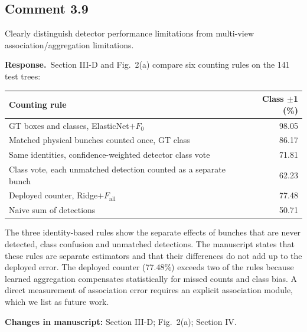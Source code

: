 \documentclass[10pt,a4paper]{article}
\newcommand{\resp}{\textbf{Response.}\ }
\newcommand{\changes}[1]{\par\textbf{Changes in manuscript:} #1}
\newcommand{\Fall}{F_{\text{all}}}
\begin{document}
\subsection{Comment 3.9}
\begin{cmt}
Clearly distinguish detector performance limitations from multi-view
association/aggregation limitations.
\end{cmt}
\resp Section III-D and Fig.~2(a) compare six counting rules on the 141 test trees:

\begin{center}
\small
\begin{tabular}{@{}lr@{}}
\toprule
Counting rule & Class $\pm$1 (\%) \\
\midrule
GT boxes and classes, ElasticNet$+F_0$ & 98.05 \\
Matched physical bunches counted once, GT class & 86.17 \\
Same identities, confidence-weighted detector class vote & 71.81 \\
Class vote, each unmatched detection counted as a separate bunch & 62.23 \\
Deployed counter, Ridge$+\Fall$ & 77.48 \\
Naive sum of detections & 50.71 \\
\bottomrule
\end{tabular}
\end{center}

The three identity-based rules show the separate effects of bunches that are never
detected, class confusion and unmatched detections. The manuscript states that these
rules are separate estimators and that their differences do not add up to the deployed
error. The deployed counter (77.48\%) exceeds two of the rules because learned
aggregation compensates statistically for missed counts and class bias. A direct
measurement of association error requires an explicit association module, which we list
as future work.
\changes{Section III-D; Fig.~2(a); Section IV.}
\end{document}
